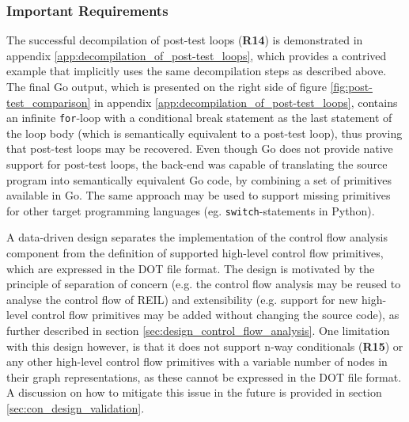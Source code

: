 
\subsubsection{Important Requirements}
\label{sec:eval_control_flow_analysis_library_important_requirements}


The successful decompilation of post-test loops (\textbf{R14}) is demonstrated in appendix \ref{app:decompilation_of_post-test_loops}, which provides a contrived example that implicitly uses the same decompilation steps as described above. The final Go output, which is presented on the right side of figure \ref{fig:post-test_comparison} in appendix \ref{app:decompilation_of_post-test_loops}, contains an infinite \texttt{for}-loop with a conditional break statement as the last statement of the loop body (which is semantically equivalent to a post-test loop), thus proving that post-test loops may be recovered. Even though Go does not provide native support for post-test loops, the back-end was capable of translating the source program into semantically equivalent Go code, by combining a set of primitives available in Go. The same approach may be used to support missing primitives for other target programming languages (eg. \texttt{switch}-statements in Python).


A data-driven design separates the implementation of the control flow analysis component from the definition of supported high-level control flow primitives, which are expressed in the DOT file format. The design is motivated by the principle of separation of concern (e.g. the control flow analysis may be reused to analyse the control flow of REIL) and extensibility (e.g. support for new high-level control flow primitives may be added without changing the source code), as further described in section \ref{sec:design_control_flow_analysis}. One limitation with this design however, is that it does not support n-way conditionals (\textbf{R15}) or any other high-level control flow primitives with a variable number of nodes in their graph representations, as these cannot be expressed in the DOT file format. A discussion on how to mitigate this issue in the future is provided in section \ref{sec:con_design_validation}.
